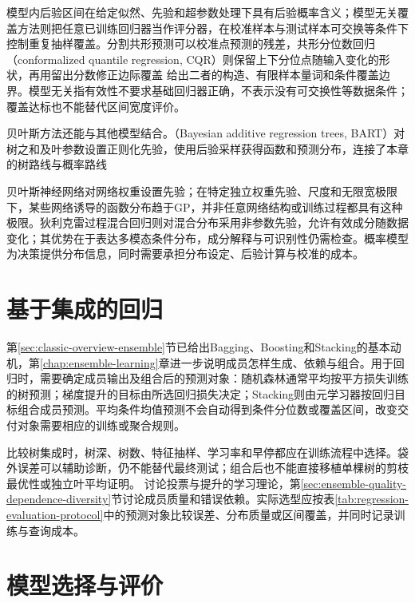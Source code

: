 模型内后验区间在给定似然、先验和超参数处理下具有后验概率含义；模型无关覆盖方法则把任意已训练回归器当作评分器，在校准样本与测试样本可交换等条件下控制重复抽样覆盖。分割共形预测可以校准点预测的残差，共形分位数回归（conformalized quantile regression, CQR）则保留上下分位点随输入变化的形状，再用留出分数修正边际覆盖
给出二者的构造、有限样本量词和条件覆盖边界。模型无关指有效性不要求基础回归器正确，不表示没有可交换性等数据条件；覆盖达标也不能替代区间宽度评价。

贝叶斯方法还能与其他模型结合。（Bayesian additive regression trees, BART）对树之和及叶参数设置正则化先验，使用后验采样获得函数和预测分布，连接了本章的树路线与概率路线

贝叶斯神经网络对网络权重设置先验；在特定独立权重先验、尺度和无限宽极限下，某些网络诱导的函数分布趋于GP，并非任意网络结构或训练过程都具有这种极限。狄利克雷过程混合回归则对混合分布采用非参数先验，允许有效成分随数据变化；其优势在于表达多模态条件分布，成分解释与可识别性仍需检查。概率模型为决策提供分布信息，同时需要承担分布设定、后验计算与校准的成本。

\section{基于集成的回归}
\label{sec:regression-ensemble}

第\ref{sec:classic-overview-ensemble}节已给出Bagging、Boosting和Stacking的基本动机，第\ref{chap:ensemble-learning}章进一步说明成员怎样生成、依赖与组合。用于回归时，需要确定成员输出及组合后的预测对象：随机森林通常平均按平方损失训练的树预测；梯度提升的目标由所选回归损失决定；Stacking则由元学习器按回归目标组合成员预测。平均条件均值预测不会自动得到条件分位数或覆盖区间，改变交付对象需要相应的训练或聚合规则。

比较树集成时，树深、树数、特征抽样、学习率和早停都应在训练流程中选择。袋外误差可以辅助诊断，仍不能替代最终测试；组合后也不能直接移植单棵树的剪枝最优性或独立叶平均证明。
讨论投票与提升的学习理论，第\ref{sec:ensemble-quality-dependence-diversity}节讨论成员质量和错误依赖。实际选型应按表\ref{tab:regression-evaluation-protocol}中的预测对象比较误差、分布质量或区间覆盖，并同时记录训练与查询成本。

\section{模型选择与评价}
\label{sec:regression-evaluation}

